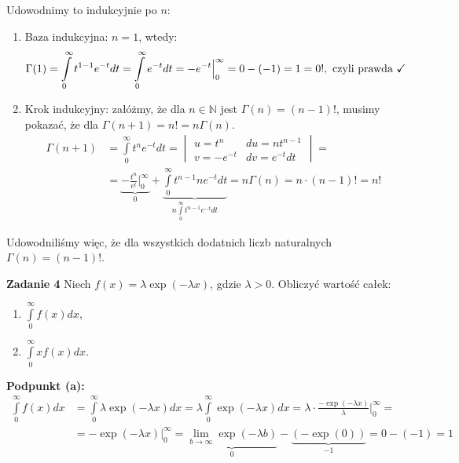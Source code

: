 \documentclass[a4paper,12pt]{article}
\begin{document}
\noindent Udowodnimy to indukcyjnie po $n$:
\begin{enumerate}
    \item Baza indukcyjna: $n=1$, wtedy:
    \[ 
        \Gamma(1) = \int\limits_{0}^{\infty} t^{1-1} e^{-t} dt = 
        \int\limits_{0}^{\infty} e^{-t} dt =
        -e^{-t} \Big{|}_0^\infty = 0 - (-1) = 1 = 0!, \text{ czyli prawda } \checkmark
    \]
    \item Krok indukcyjny: załóżmy, że dla $n \in \mathbb{N}$ jest $\Gamma(n) = (n-1)!$,
          musimy pokazać, że dla $\Gamma(n+1) = n! = n\Gamma(n)$.
    \begin{align*}
        \Gamma(n+1) &= \int\limits_{0}^{\infty} t^{n} e^{-t} dt =
        \begin{vmatrix}
            u = t^n         &   du = nt^{n-1}   \\
            v = -e^{-t}     &   dv = e^{-t} dt
        \end{vmatrix} = \\
        &= \underbrace{- \frac{t^n}{e^t} \Big|_0^\infty}_{0}
        + \underbrace{\int\limits_{0}^{\infty} t^{n-1} n e^{-t} dt}_{
            n \int\limits_{0}^{\infty} t^{n-1} e^{-t} dt
        } 
        = n\Gamma(n) = n \cdot (n-1)! = n!
    \end{align*}
\end{enumerate}

\noindent Udowodniliśmy więc, że dla wszystkich dodatnich liczb naturalnych 
$\Gamma(n) = (n-1)!$.

\newpage
\noindent \textbf{Zadanie 4} \newline
Niech $f(x) = \lambda \exp (-\lambda x)$, gdzie $\lambda > 0$. Obliczyć wartość całek:
\begin{enumerate}[label=(\alph*)]
    \item $\int\limits_{0}^{\infty} f(x) dx$,
    \item $\int\limits_{0}^{\infty} x f(x) dx$.
\end{enumerate}

\noindent \textbf{Podpunkt (a):}
\begin{align*}
    \int\limits_{0}^{\infty} f(x) dx &= 
        \int\limits_{0}^{\infty} \lambda \exp (-\lambda x) dx =
        \lambda \int\limits_{0}^{\infty} \exp (-\lambda x) dx =
        \lambda \cdot \frac{-\exp(-\lambda x)}{\lambda} \Big|_0^\infty = \\
    &= -\exp(-\lambda x) \Big|_0^\infty =
        \underbrace{\lim\limits_{b \to \infty} \exp(-\lambda b)}_{0} 
        - \underbrace{(-\exp(0))}_{-1} = 0 - (-1) = 1
\end{align*}
\end{document}

